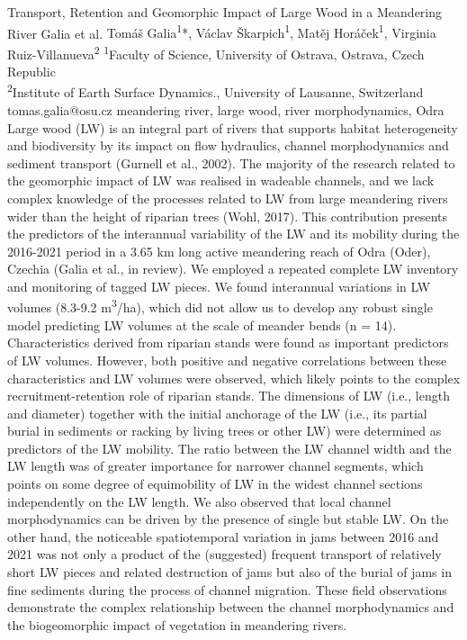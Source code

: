 \abstract
{Transport, Retention and Geomorphic Impact of Large Wood in a Meandering River} %
{Galia et al.} %
{Tomáš Galia\textsuperscript{1}*, Václav Škarpich\textsuperscript{1}, Matěj Horáček\textsuperscript{1}, Virginia Ruiz-Villanueva\textsuperscript{2}} %
{\TLtag} %
{\textsuperscript{1}Faculty of Science, University of Ostrava, Ostrava, Czech Republic\\
\textsuperscript{2}Institute of Earth Surface Dynamics., University of Lausanne, Switzerland
} %
{tomas.galia@osu.cz}  %
{meandering river, large wood, river morphodynamics, Odra}%
{Large wood (LW) is an integral part of rivers that supports habitat heterogeneity and biodiversity by its impact on flow hydraulics, channel morphodynamics and sediment transport (Gurnell et al., 2002). The majority of the research related to the geomorphic impact of LW was realised in wadeable channels, and we lack complex knowledge of the processes related to LW from large meandering rivers wider than the height of riparian trees (Wohl, 2017). This contribution presents the predictors of the interannual variability of the LW and its mobility during the 2016-2021 period in a 3.65 km long active meandering reach of Odra (Oder), Czechia (Galia et al., in review). We employed a repeated complete LW inventory and monitoring of tagged LW pieces. We found interannual variations in LW volumes (8.3-9.2 m\textsuperscript{3}/ha), which did not allow us to develop any robust single model predicting LW volumes at the scale of meander bends (n = 14). Characteristics derived from riparian stands were found as important predictors of LW volumes. However, both positive and negative correlations between these characteristics and LW volumes were observed, which likely points to the complex recruitment-retention role of riparian stands. The dimensions of LW (i.e., length and diameter) together with the initial anchorage of the LW (i.e., its partial burial in sediments or racking by living trees or other LW) were determined as predictors of the LW mobility. The ratio between the LW channel width and the LW length was of greater importance for narrower channel segments, which points on some degree of equimobility of LW in the widest channel sections independently on the LW length. We also observed that local channel morphodynamics can be driven by the presence of single but stable LW. On the other hand, the noticeable spatiotemporal variation in jams between 2016 and 2021 was not only a product of the (suggested) frequent transport of relatively short LW pieces and related destruction of jams but also of the burial of jams in fine sediments during the process of channel migration. These field observations demonstrate the complex relationship between the channel morphodynamics and the biogeomorphic impact of vegetation in meandering rivers.
}%
